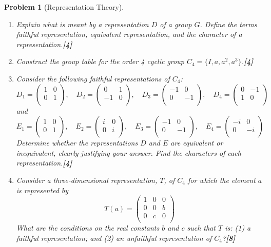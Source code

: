 \documentclass[a4paper]{article}
\theoremstyle{new}
\newtheorem{qns}{Problem}[section]
\begin{document}
\newpage
\begin{qns}[Representation Theory]\leavevmode
\begin{enumerate}[label=(\roman*)]
\item Explain what is meant by a representation $D$ of a group $G$. Define the terms faithful representation, equivalent representation, and the character of a representation.\hfill\textbf{[4]}
\item Construct the group table for the order 4 cyclic group $C_4=\{I,a,a^2,a^3\}$.\hfill\textbf{[4]}
\item Consider the following faithful representations of $C_4$:
$$D_1=\begin{pmatrix}1&0\\0&1\\\end{pmatrix},\quad D_2=\begin{pmatrix}0&1\\-1&0\\\end{pmatrix},\quad D_3=\begin{pmatrix}-1&0\\0&-1\\\end{pmatrix},\quad D_4=\begin{pmatrix}0&-1\\1&0\\\end{pmatrix}$$
and
$$E_1 =\begin{pmatrix}1&0\\0&1\\\end{pmatrix},\quad E_2 =\begin{pmatrix}i&0\\0&i\\\end{pmatrix},\quad E_3 =\begin{pmatrix}-1&0\\0&-1\\\end{pmatrix},\quad E_4 =\begin{pmatrix}-i&0\\0&-i\\\end{pmatrix}$$
Determine whether the representations $D$ and $E$ are equivalent or inequivalent, clearly justifying your answer. Find the characters of each representation.\hfill\textbf{[4]}
\item Consider a three-dimensional representation, $T$, of $C_4$ for which the element $a$ is represented by
$$T(a)=\begin{pmatrix}1&0&0\\0&0&b\\0&c&0\\\end{pmatrix}$$
What are the conditions on the real constants $b$ and $c$ such that $T$ is: (1) a faithful representation; and (2) an unfaithful representation of $C_4$?\hfill\textbf{[8]}
\end{enumerate}
\end{qns}
\end{document}
